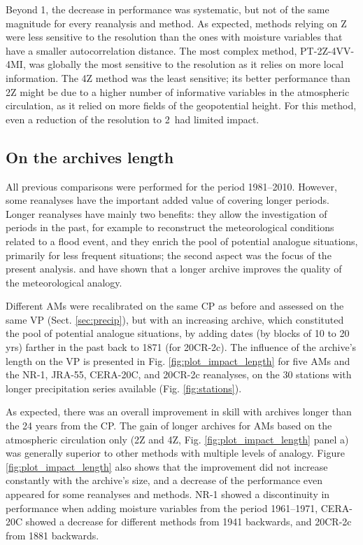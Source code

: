 \documentclass[smallextended]{svjour3}       %
\begin{document}
	Beyond 1\degree, the decrease in performance was systematic, but not of the same magnitude for every reanalysis and method. As expected, methods relying on Z were less sensitive to the resolution than the ones with moisture variables that have a smaller autocorrelation distance. The most complex method, PT-2Z-4VV-4MI, was globally the most sensitive to the resolution as it relies on more local information. The 4Z method was the least sensitive; its better performance than 2Z might be due to a higher number of informative variables in the atmospheric circulation, as it relied on more fields of the geopotential height. For this method, even a reduction of the resolution to 2\degree\ had limited impact.
	
	
	\subsection{On the archives length}
	\label{sec:length}
	
	All previous comparisons were performed for the period 1981--2010. However, some reanalyses have the important added value of covering longer periods. Longer reanalyses have mainly two benefits: they allow the investigation of periods in the past, for example to reconstruct the meteorological conditions related to a flood event, and they enrich the pool of potential analogue situations, primarily for less frequent situations; the second aspect was the focus of the present analysis. \citet{Ruosteenoja1988} and \citet{Vandendool1994} have shown that a longer archive improves the quality of the meteorological analogy.
	
	Different AMs were recalibrated on the same CP as before and assessed on the same VP (Sect. \ref{sec:precip}), but with an increasing archive, which constituted the pool of potential analogue situations, by adding dates (by blocks of 10 to 20 yrs) farther in the past back to 1871 (for 20CR-2c). The influence of the archive's length on the VP is presented in Fig. \ref{fig:plot_impact_length} for five AMs and the NR-1, JRA-55, CERA-20C, and 20CR-2c reanalyses, on the 30 stations with longer precipitation series available (Fig. \ref{fig:stations}). 
	
	As expected, there was an overall improvement in skill with archives longer than the 24 years from the CP. The gain of longer archives for AMs based on the atmospheric circulation only (2Z and 4Z, Fig. \ref{fig:plot_impact_length} panel a) was generally superior to other methods with multiple levels of analogy. Figure \ref{fig:plot_impact_length} also shows that the improvement did not increase constantly with the archive's size, and a decrease of the performance even appeared for some reanalyses and methods. NR-1 showed a discontinuity in performance when adding moisture variables from the period 1961--1971, CERA-20C showed a decrease for different methods from 1941 backwards, and 20CR-2c from 1881 backwards.
	
\end{document}
